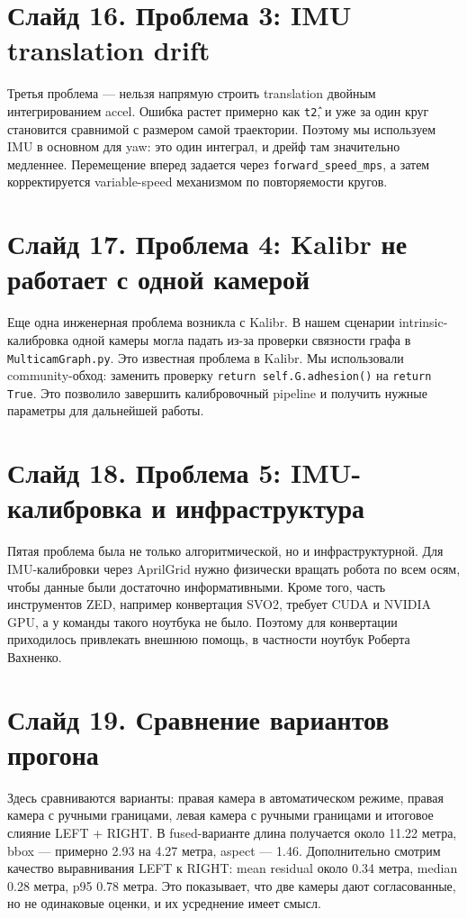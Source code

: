 \documentclass[12pt,a4paper]{article}
\newcommand{\code}[1]{\texttt{#1}}
\begin{document}
\section*{Слайд 16. Проблема 3: IMU translation drift}

Третья проблема --- нельзя напрямую строить translation двойным интегрированием accel. Ошибка растет примерно как \code{t\^2}, и уже за один круг становится сравнимой с размером самой траектории. Поэтому мы используем IMU в основном для yaw: это один интеграл, и дрейф там значительно медленнее. Перемещение вперед задается через \code{forward\_speed\_mps}, а затем корректируется variable-speed механизмом по повторяемости кругов.

\section*{Слайд 17. Проблема 4: Kalibr не работает с одной камерой}

Еще одна инженерная проблема возникла с Kalibr. В нашем сценарии intrinsic-калибровка одной камеры могла падать из-за проверки связности графа в \code{MulticamGraph.py}. Это известная проблема в Kalibr. Мы использовали community-обход: заменить проверку \code{return self.G.adhesion()} на \code{return True}. Это позволило завершить калибровочный pipeline и получить нужные параметры для дальнейшей работы.

\section*{Слайд 18. Проблема 5: IMU-калибровка и инфраструктура}

Пятая проблема была не только алгоритмической, но и инфраструктурной. Для IMU-калибровки через AprilGrid нужно физически вращать робота по всем осям, чтобы данные были достаточно информативными. Кроме того, часть инструментов ZED, например конвертация SVO2, требует CUDA и NVIDIA GPU, а у команды такого ноутбука не было. Поэтому для конвертации приходилось привлекать внешнюю помощь, в частности ноутбук Роберта Вахненко.

\section*{Слайд 19. Сравнение вариантов прогона}

Здесь сравниваются варианты: правая камера в автоматическом режиме, правая камера с ручными границами, левая камера с ручными границами и итоговое слияние LEFT + RIGHT. В fused-варианте длина получается около 11.22 метра, bbox --- примерно 2.93 на 4.27 метра, aspect --- 1.46. Дополнительно смотрим качество выравнивания LEFT к RIGHT: mean residual около 0.34 метра, median 0.28 метра, p95 0.78 метра. Это показывает, что две камеры дают согласованные, но не одинаковые оценки, и их усреднение имеет смысл.
\end{document}
